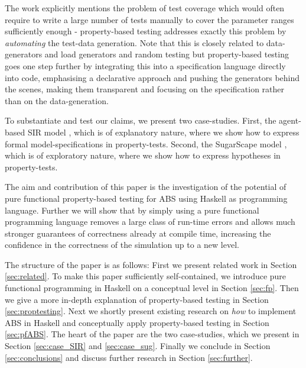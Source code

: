 The work \cite{onggo_test-driven_2016} explicitly mentions the problem of test coverage which would often require to write a large number of tests manually to cover the parameter ranges sufficiently enough - property-based testing addresses exactly this problem by \textit{automating} the test-data generation. Note that this is closely related to data-generators \cite{gurcan_generic_2013} and load generators and random testing \cite{burnstein_practical_2010} but property-based testing goes one step further by integrating this into a specification language directly into code, emphasising a declarative approach and pushing the generators behind the scenes, making them transparent and focusing on the specification rather than on the data-generation. 

To substantiate and test our claims, we present two case-studies. First, the agent-based SIR model \cite{macal_agent-based_2010}, which is of explanatory nature, where we show how to express formal model-specifications in property-tests. Second, the SugarScape model \cite{epstein_growing_1996}, which is of exploratory nature, where we show how to express hypotheses in property-tests. 

The aim and contribution of this paper is the investigation of the potential of pure functional property-based testing for ABS using Haskell as programming language. Further we will show that by simply using a pure functional programming language removes a large class of run-time errors and allows much stronger guarantees of correctness already at compile time, increasing the confidence in the correctness of the simulation up to a new level.

The structure of the paper is as follows: First we present related work in Section \ref{sec:related}. To make this paper sufficiently self-contained, we introduce pure functional programming in Haskell on a conceptual level in Section \ref{sec:fp}. Then we give a more in-depth explanation of property-based testing in Section \ref{sec:proptesting}. Next we shortly present existing research on \textit{how} to implement ABS in Haskell and conceptually apply property-based testing in Section \ref{sec:pfABS}. The heart of the paper are the two case-studies, which we present in Section \ref{sec:case_SIR} and \ref{sec:case_sug}. Finally we conclude in Section \ref{sec:conclusions} and discuss further research in Section \ref{sec:further}. 